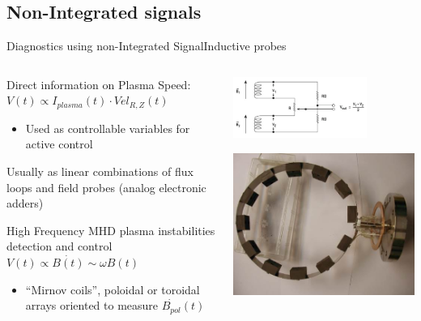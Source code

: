 \documentclass{beamer}
\begin{document}
\subsection{Non-Integrated signals}
\begin{frame}{Diagnostics using  non-Integrated Signal}{Inductive probes}
\begin{columns}
	\begin{itemize}
		 { \item Direct information on Plasma Speed:  $V(t) \propto I_{plasma}(t) \cdot Vel_{R,Z}(t)$
			\begin{itemize}
				\item Used as controllable variables for active control
			\end{itemize}
			 \item Usually as linear combinations of flux loops and field probes (analog electronic adders)
 		}
		 {\item High Frequency MHD plasma instabilities  detection and control $V(t) \propto \dot{B(t)}  \sim \omega B(t)$
			\begin{itemize}
				\item “Mirnov coils”, poloidal or toroidal arrays  oriented to measure $\dot{B_{pol}}(t) $%
			\end{itemize}
		}
	\end{itemize}

	\begin{center}
		\includegraphics[trim = 0mm 0mm 0mm 1mm, clip, height = 2cm]{probesSum.png}

		\includegraphics[height = 2.cm]{isttokMirn.jpg}
	\end{center}
\end{columns}
\end{frame}
\end{document}
